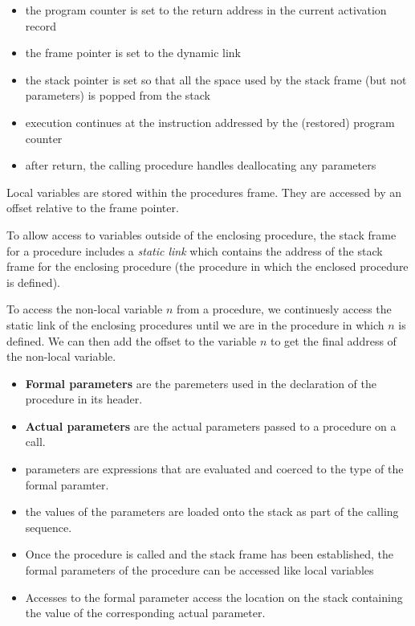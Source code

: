 \begin{itemize}
    \item the program counter is set to the return address in the current activation record
    \item the frame pointer is set to the dynamic link
    \item the stack pointer is set so that all the space used by the stack frame (but not 
    parameters) is popped from the stack
    \item execution continues at the instruction addressed by the (restored) program counter
    \item after return, the calling procedure handles deallocating any parameters
\end{itemize}

Local variables are stored within the procedures frame. They are accessed by an offset 
relative to the frame pointer.

To allow access to variables outside of the enclosing procedure, the stack frame for a 
procedure includes a \textit{static link} which contains the address of the stack frame 
for the enclosing procedure (the procedure in which the enclosed procedure is defined).

To access the non-local variable $n$ from a procedure, we continuesly access the static link 
of the enclosing procedures until we are in the procedure in which $n$ is defined. We can then
add the offset to the variable $n$ to get the final address of the non-local variable.

\begin{itemize}
    \item \textbf{Formal parameters} are the paremeters used in the declaration of the procedure 
    in its header.
    \item \textbf{Actual parameters} are the actual parameters passed to a procedure on a call.
\end{itemize}
\begin{itemize}
    \item parameters are expressions that are evaluated and coerced to the type of the formal 
    paramter.
    \item the values of the parameters are loaded onto the stack as part of the calling sequence.
    \item Once the procedure is called and the stack frame has been established, the formal 
    parameters of the procedure can be accessed like local variables
    \item Accesses to the formal parameter access the location on the stack containing the value of the
    corresponding actual parameter.
\end{itemize}

